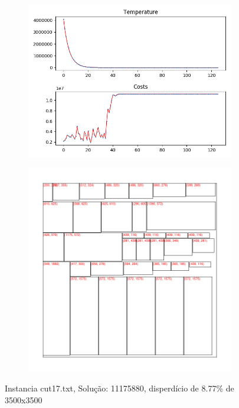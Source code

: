 \begin{figure}
\centering
\begin{subfigure}{.5\textwidth}
  \centering
  \includegraphics[width=1\linewidth]{results/cut17/2/plot}
  \label{fig:sub1}
\end{subfigure}%
\begin{subfigure}{.5\textwidth}
  \centering
  \includegraphics[width=1\linewidth]{results/cut17/2/cut}
  \label{fig:sub2}
\end{subfigure}
\caption{Instancia cut17.txt, Solução: 11175880, disperdício de 8.77\% de 3500x3500}
\label{fig:test}
\end{figure}


